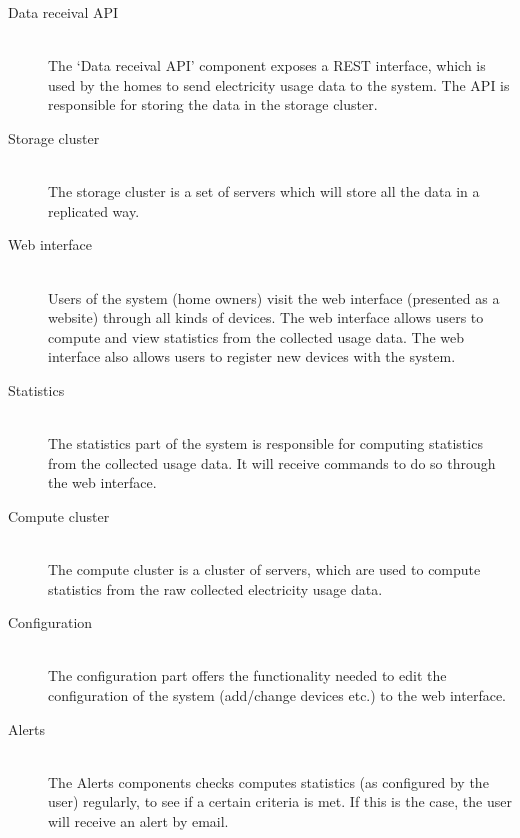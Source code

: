 \begin{description}
	\item[Data receival API] ~\\ The `Data receival API' component exposes a REST interface, which is used by the homes to send electricity usage data to the system. The API is responsible for storing the data in the storage cluster.
	
	\item[Storage cluster] ~\\ The storage cluster is a set of servers which will store all the data in a replicated way.
	
	\item[Web interface] ~\\ Users of the system (home owners) visit the web interface (presented as a website) through all kinds of devices. The web interface allows users to compute and view statistics from the collected usage data. The web interface also allows users to register new devices with the system.
	
	\item[Statistics] ~\\ The statistics part of the system is responsible for computing statistics from the collected usage data. It will receive commands to do so through the web interface.
	
	\item[Compute cluster] ~\\ The compute cluster is a cluster of servers, which are used to compute statistics from the raw collected electricity usage data.
	
	\item[Configuration] ~\\ The configuration part offers the functionality needed to edit the configuration of the system (add/change devices etc.) to the web interface.
	
	\item[Alerts] ~\\ The Alerts components checks computes statistics (as configured by the user) regularly, to see if a certain criteria is met. If this is the case, the user will receive an alert by email. 
	
\end{description}

